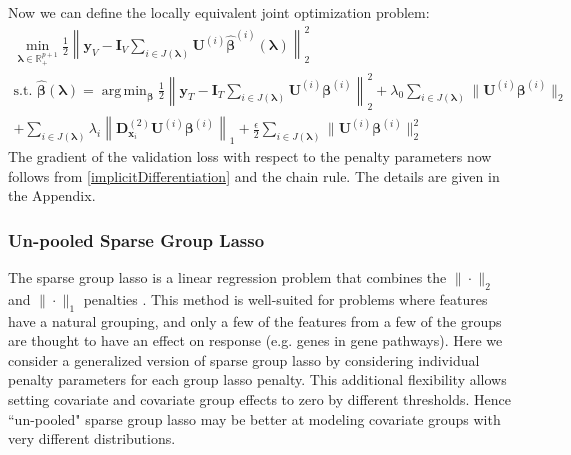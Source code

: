 \documentclass[12pt]{article}
\DeclareMathOperator*{\argmin}{arg\,min}
\begin{document}
Now we can define the locally equivalent joint optimization problem:
\begin{equation}
\begin{array}{c}
\min_{\boldsymbol{\lambda} \in \mathbb{R}^{p+1}_{+}}
\frac{1}{2} \left \| \boldsymbol{y}_V
- \boldsymbol{I}_V \sum_{i\in J(\boldsymbol\lambda)} \boldsymbol {U}^{(i)} \hat{\boldsymbol{\beta}}^{(i)}(\boldsymbol{\lambda})
 \right \|^2_2 \\
\text{s.t. }
\hat{\boldsymbol{\beta}}(\boldsymbol{\lambda}) = \argmin_{\boldsymbol \beta}
\frac{1}{2} \left \| \boldsymbol{y}_T
- \boldsymbol{I}_T \sum_{i\in J(\boldsymbol\lambda)} \boldsymbol {U}^{(i)} \boldsymbol{\beta}^{(i)}
\right \|^2_2
+ \lambda_0 \sum_{i\in J(\boldsymbol\lambda)}  \| \boldsymbol {U}^{(i)} \boldsymbol{\beta}^{(i)} \|_2 \\
+ \sum_{i\in J(\boldsymbol\lambda)} \lambda_i \left \| \boldsymbol{D}^{(2)}_{\boldsymbol{x}_i} \boldsymbol {U}^{(i)} \boldsymbol{\beta}^{(i)} \right \|_1
+ \frac{\epsilon}{2}  \sum_{i\in J(\boldsymbol\lambda)} \| \boldsymbol {U}^{(i)} \boldsymbol{\beta}^{(i)} \|_2^2
\end{array}
\end{equation}
The gradient of the validation loss with respect to the penalty parameters now follows from \eqref{implicitDifferentiation} and the chain rule. The details are given in the Appendix.

\subsubsection{Un-pooled Sparse Group Lasso}\label{sec:sgl}

The sparse group lasso is a linear regression problem that combines the $\|\cdot\|_2$ and $\|\cdot\|_1$ penalties \citep{simon2013sparse}. This method is well-suited for problems where features have a natural grouping, and only a few of the features from a few of the groups are thought to have an effect on response (e.g. genes in gene pathways). Here we consider a generalized version of sparse group lasso by considering individual penalty parameters for each group lasso penalty. This additional flexibility allows setting covariate and covariate group effects to zero by different thresholds. Hence ``un-pooled" sparse group lasso may be better at modeling covariate groups with very different distributions.
\end{document}
